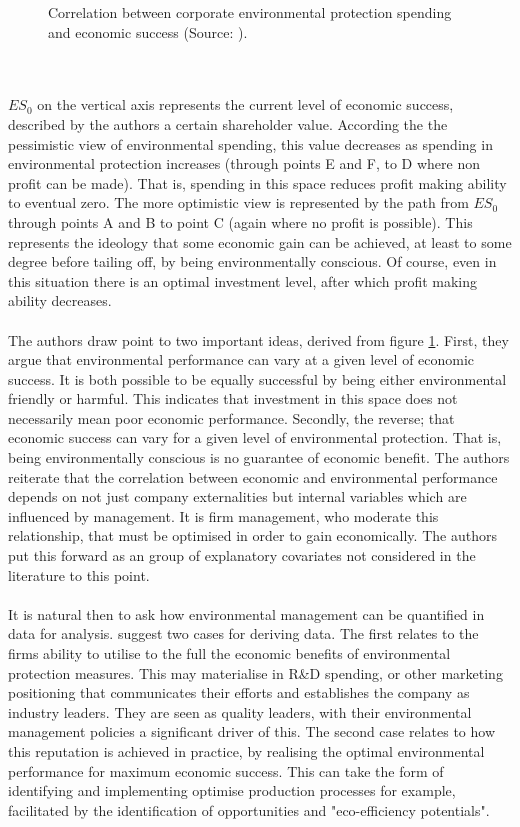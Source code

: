 {\begin{figure}[h]
\caption{Correlation between corporate environmental protection spending and economic success (Source: \cite{schaltegger2002link}).}
\label{ch3_successAndEnviornment}
\end{figure}\\\\
$ES_0$ on the vertical axis represents the current level of economic success, described by the authors a certain shareholder value. According the the pessimistic view of environmental spending, this value decreases as spending in environmental protection increases (through points E and F, to D where non profit can be made). That is, spending in this space reduces profit making ability to eventual zero. The more optimistic view is represented by the path from $ES_0$ through points A and B to point C (again where no profit is possible). This represents the ideology that some economic gain can be achieved, at least to some degree before tailing off, by being environmentally conscious. Of course, even in this situation there is an optimal investment level, after which profit making ability decreases. \\\\
The authors draw point to two important ideas, derived from figure \ref{ch3_successAndEnviornment}. First, they argue that environmental performance can vary at a given level of economic success. It is both possible to be equally successful by being either environmental friendly or harmful. This indicates that investment in this space does not necessarily mean poor economic performance. Secondly, the reverse; that economic success can vary for a given level of environmental protection. That is, being environmentally conscious is no guarantee of economic benefit. The authors reiterate that the correlation between economic and environmental performance depends on not just company externalities but internal variables which are influenced by management. It is firm management, who moderate this relationship, that must be optimised in order to gain economically. The authors put this forward as an group of explanatory covariates not considered in the literature to this point. \\\\
It is natural then to ask how environmental management can be quantified in data for analysis. \cite{schaltegger2002link} suggest two cases for deriving data. The first relates to the firms ability to utilise to the full the economic benefits of environmental protection measures. This may materialise in R\&D spending, or other marketing positioning that communicates their efforts and establishes the company as industry leaders. They are seen as quality leaders, with their environmental management policies a significant driver of this. The second case relates to how this reputation is achieved in practice, by realising the optimal environmental performance for maximum economic success. This can take the form of identifying and implementing optimise production processes for example, facilitated by the identification of opportunities and "eco-efficiency potentials". \\\\
}

